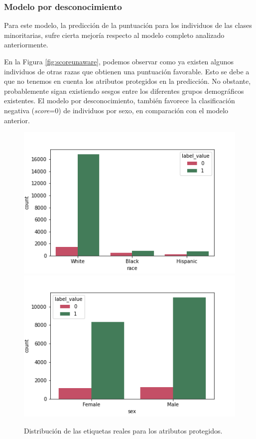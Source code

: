 \documentclass[oneside,openright,titlepage,numbers=noenddot,openany,headinclude,footinclude=true,
cleardoublepage=empty,abstractoff,BCOR=5mm,paper=a4,fontsize=12pt,main=spanish]{scrreprt}
\begin{document}
\subsubsection*{Modelo por desconocimiento}

Para este modelo, la predicción de la puntuación para los individuos de las clases minoritarias, sufre cierta mejoría respecto al modelo completo analizado anteriormente.

En la Figura \ref{fig:scoreunaware}, podemos observar como ya existen algunos individuos de otras razas que obtienen una puntuación favorable. Esto se debe a que no tenemos en cuenta los atributos protegidos en la predicción. No obstante, probablemente sigan existiendo sesgos entre los diferentes grupos demográficos existentes. El modelo por desconocimiento, también favorece la clasificación negativa (\textit{score}=0) de individuos por sexo, en comparación con el modelo anterior.\\

\begin{figure}[H]
      \includegraphics[width=\linewidth]{images/label_race_law_2.png}
    \endminipage\hfill
      \includegraphics[width=\linewidth]{images/label_sex_law_2.png}
    \endminipage
     \caption{Distribución de las etiquetas reales para los atributos protegidos.}
     \label{fig:labelracesex4}
\end{figure}
\end{document}
